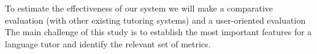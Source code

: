 
To estimate the effectiveness of our system we will make a comparative
evaluation (with other existing tutoring systems) and a user-oriented evaluation
The main challenge of this study is to establish the most important features for
a language tutor and identify the relevant set of metrics. 








